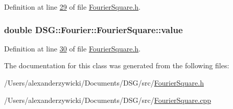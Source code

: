 Definition at line \hyperlink{_fourier_square_8h_source_l00029}{29} of file \hyperlink{_fourier_square_8h_source}{Fourier\+Square.\+h}.

\hypertarget{class_d_s_g_1_1_fourier_1_1_fourier_square_a5817c7b9b793af6a76278065a67acd9c}{
\subsubsection[{value}]{\setlength{\rightskip}{0pt plus 5cm}double D\+S\+G\+::\+Fourier\+::\+Fourier\+Square\+::value\hspace{0.3cm}{\ttfamily [protected]}}}\label{class_d_s_g_1_1_fourier_1_1_fourier_square_a5817c7b9b793af6a76278065a67acd9c}


Definition at line \hyperlink{_fourier_square_8h_source_l00030}{30} of file \hyperlink{_fourier_square_8h_source}{Fourier\+Square.\+h}.



The documentation for this class was generated from the following files\+:\begin{DoxyCompactItemize}
\item 
/\+Users/alexanderzywicki/\+Documents/\+D\+S\+G/src/\hyperlink{_fourier_square_8h}{Fourier\+Square.\+h}\item 
/\+Users/alexanderzywicki/\+Documents/\+D\+S\+G/src/\hyperlink{_fourier_square_8cpp}{Fourier\+Square.\+cpp}\end{DoxyCompactItemize}
